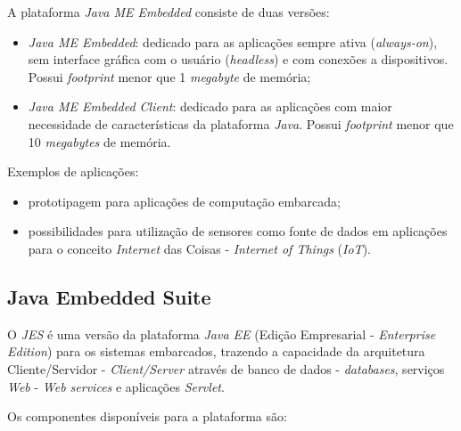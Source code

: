 A plataforma \textit{Java ME Embedded} consiste de duas versões:

\begin{itemize}

    \item \textit{Java ME Embedded}: dedicado para as aplicações sempre ativa
    (\textit{always-on}), sem interface gráfica com o usuário
    (\textit{headless}) e com conexões a dispositivos. Possui
    \textit{footprint} menor que 1 \textit{megabyte} de memória;

    \item \textit{Java ME Embedded Client}: dedicado para as aplicações com
    maior necessidade de características da plataforma \textit{Java}. Possui
    \textit{footprint} menor que 10 \textit{megabytes} de memória.

\end{itemize}

Exemplos de aplicações:

\begin{itemize}

    \item prototipagem para aplicações de computação embarcada;

    \item possibilidades para utilização de sensores como fonte de dados em
    aplicações para o conceito \textit{Internet} das Coisas - \textit{Internet of Things} (\textit{IoT}).

\end{itemize}

\subsection{Java Embedded Suite}

O \textit{JES} é uma versão da plataforma \textit{Java EE}
(Edição Empresarial - \textit{Enterprise Edition}) para os sistemas embarcados,
trazendo a capacidade da arquitetura Cliente/Servidor - \textit{Client/Server} através de banco de
dados - \textit{databases}, serviços \textit{Web} - \textit{Web services} e aplicações \textit{Servlet}.

Os componentes disponíveis para a plataforma são:


